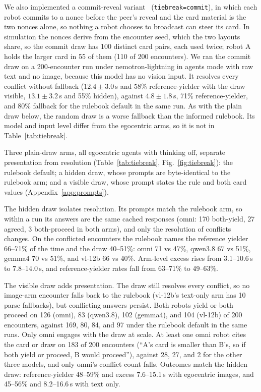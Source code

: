 \documentclass[journal]{IEEEtran}
\begin{document}
We also implemented a commit-reveal variant~\cite{blum1983coin} (\texttt{tiebreak=commit}), in which each robot commits to a nonce before the peer's reveal and the card material is the two nonces alone, so nothing a robot chooses to broadcast can steer its card. In simulation the nonces derive from the encounter seed, which the two layouts share, so the commit draw has 100 distinct card pairs, each used twice; robot A holds the larger card in 55 of them (110 of 200 encounters). We ran the commit draw on a 200-encounter run under nemotron-lightning in agents mode with raw text and no image, because this model has no vision input. It resolves every conflict without fallback ($12.4\pm3.0$\,s and 58\% reference-yielder with the draw visible, $13.1\pm3.2$\,s and 55\% hidden), against $4.8\pm1.8$\,s, 71\% reference-yielder, and 80\% fallback for the rulebook default in the same run. As with the plain draw below, the random draw is a worse fallback than the informed rulebook. Its model and input level differ from the egocentric arms, so it is not in Table~\ref{tab:tiebreak}. %

Three plain-draw arms, all egocentric agents with thinking off, separate presentation from resolution (Table~\ref{tab:tiebreak}, Fig.~\ref{fig:tiebreak}): the rulebook default; a hidden draw, whose prompts are byte-identical to the rulebook arm; and a visible draw, whose prompt states the rule and both card values (Appendix~\ref{app:prompts}).

The hidden draw isolates resolution. Its prompts match the rulebook arm, so within a run its answers are the same cached responses (omni: 170 both-yield, 27 agreed, 3 both-proceed in both arms), and only the resolution of conflicts changes. On the conflicted encounters the rulebook names the reference yielder 66--71\% of the time and the draw 40--51\%: omni 71 vs 47\%, qwen3.8 67 vs 51\%, gemma4 70 vs 51\%, and vl-12b 66 vs 40\%. Arm-level excess rises from 3.1--10.6\,s to 7.8--14.0\,s, and reference-yielder rates fall from 63--71\% to 49--63\%.

The visible draw adds presentation. The draw still resolves every conflict, so no image-arm encounter falls back to the rulebook (vl-12b's text-only arm has 10 parse fallbacks), but conflicting answers persist. Both robots yield or both proceed on 126 (omni), 83 (qwen3.8), 102 (gemma4), and 104 (vl-12b) of 200 encounters, against 169, 80, 84, and 97 under the rulebook default in the same runs. Only omni engages with the draw at scale. At least one omni robot cites the card or draw on 183 of 200 encounters (``A's card is smaller than B's, so if both yield or proceed, B would proceed''), against 28, 27, and 2 for the other three models, and only omni's conflict count falls. Outcomes match the hidden draw: reference-yielder 48--59\% and excess 7.6--15.1\,s with egocentric images, and 45--56\% and 8.2--16.6\,s with text only.
\end{document}
